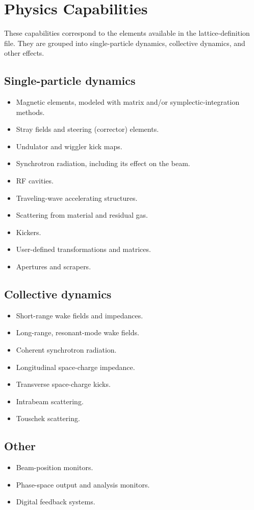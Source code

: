 \documentclass[11pt]{article}
\begin{document}
\section{Physics Capabilities}

These capabilities correspond to the elements available in the
lattice-definition file. They are grouped into single-particle dynamics,
collective dynamics, and other effects.

\subsection{Single-particle dynamics}
\begin{itemize}
  \item Magnetic elements, modeled with matrix and/or symplectic-integration
        methods.
  \item Stray fields and steering (corrector) elements.
  \item Undulator and wiggler kick maps.
  \item Synchrotron radiation, including its effect on the beam.
  \item RF cavities.
  \item Traveling-wave accelerating structures.
  \item Scattering from material and residual gas.
  \item Kickers.
  \item User-defined transformations and matrices.
  \item Apertures and scrapers.
\end{itemize}

\subsection{Collective dynamics}
\begin{itemize}
  \item Short-range wake fields and impedances.
  \item Long-range, resonant-mode wake fields.
  \item Coherent synchrotron radiation.
  \item Longitudinal space-charge impedance.
  \item Transverse space-charge kicks.
  \item Intrabeam scattering.
  \item Touschek scattering.
\end{itemize}

\subsection{Other}
\begin{itemize}
  \item Beam-position monitors.
  \item Phase-space output and analysis monitors.
  \item Digital feedback systems.
\end{itemize}
\end{document}
